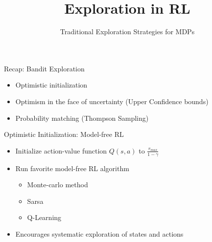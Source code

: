


\title[RL: Exploration]{Exploration in RL}
\subtitle{Traditional Exploration Strategies for MDPs}




	
	\maketitle

\begin{frame}[c]{Recap: Bandit Exploration}

\begin{itemize}
	\item Optimistic initialization
	\item Optimism in the face of uncertainty (Upper Confidence bounds)
	\item Probability matching (Thompson Sampling)
\end{itemize}

\end{frame}
\begin{frame}[c]{Optimistic Initialization: Model-free RL}
	
	\begin{itemize}
		\item Initialize action-value function $Q(s,a)$ to $\frac{r_{max}}{1-\gamma}$
		\item Run favorite model-free RL algorithm
		\begin{itemize}
			\item Monte-carlo method
			\item Sarsa
			\item Q-Learning
		\end{itemize}
		\item Encourages systematic exploration of states and actions
	\end{itemize}
	
\end{frame}
